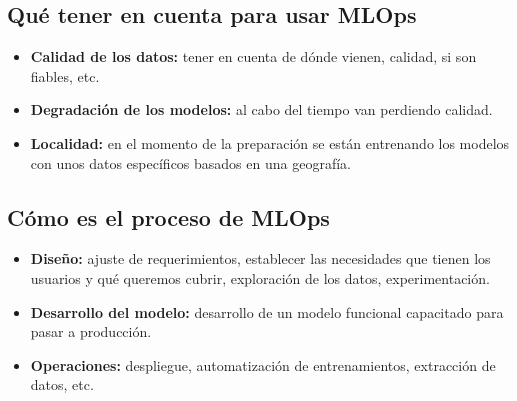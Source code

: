\documentclass[twoside,twocolumn]{article}
\begin{document}
\subsection{Qué tener en cuenta para usar MLOps}
\begin{itemize}
    \item \textbf{Calidad de los datos:} tener en cuenta de dónde vienen, calidad, si son fiables, etc.
    \item \textbf{Degradación de los modelos:} al cabo del tiempo van perdiendo calidad.
    \item \textbf{Localidad:} en el momento de la preparación se están entrenando los modelos con unos datos específicos basados en una geografía.
\end{itemize}

\subsection{Cómo es el proceso de MLOps}
\begin{itemize}
    \item \textbf{Diseño:} ajuste de requerimientos, establecer las necesidades que tienen los usuarios y qué queremos cubrir, exploración de los datos, experimentación.
    \item \textbf{Desarrollo del modelo:} desarrollo de un modelo funcional capacitado para pasar a producción.
    \item \textbf{Operaciones:} despliegue, automatización de entrenamientos, extracción de datos, etc.    
\end{itemize}
\end{document}
